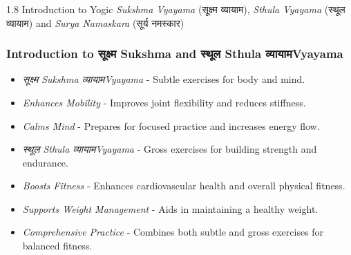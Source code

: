\begin{frame}[fragile]\frametitle{}
\begin{center}
{\Large 1.8 Introduction to Yogic \textit{Sukshma Vyayama} (सूक्ष्म व्यायाम), \textit{Sthula Vyayama} (स्थूल व्यायाम) and \textit{Surya Namaskara} (सूर्य नमस्कार)}
\end{center}
\end{frame}

\begin{frame}[fragile]\frametitle{Introduction to सूक्ष्म Sukshma and स्थूल Sthula व्यायामVyayama}

  \begin{itemize}
	\item \textit{सूक्ष्म Sukshma व्यायामVyayama} - Subtle exercises for body and mind.
	\item \textit{Enhances Mobility} - Improves joint flexibility and reduces stiffness.
	\item \textit{Calms Mind} - Prepares for focused practice and increases energy flow.
	\item \textit{स्थूल Sthula व्यायामVyayama} - Gross exercises for building strength and endurance.
	\item \textit{Boosts Fitness} - Enhances cardiovascular health and overall physical fitness.
	\item \textit{Supports Weight Management} - Aids in maintaining a healthy weight.
	\item \textit{Comprehensive Practice} - Combines both subtle and gross exercises for balanced fitness.
  \end{itemize}
\end{frame}




